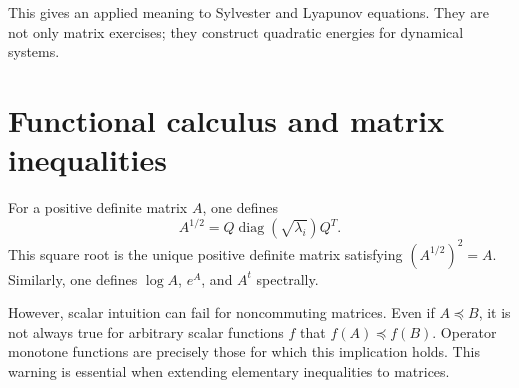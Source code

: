 This gives an applied meaning to Sylvester and Lyapunov equations.  They are not only matrix exercises; they construct quadratic energies for dynamical systems.

\section{Functional calculus and matrix inequalities}

For a positive definite matrix $A$, one defines
\[
  A^{1/2}=Q\operatorname{diag}(\sqrt{\lambda_i})Q^T.
\]
This square root is the unique positive definite matrix satisfying $(A^{1/2})^2=A$.  Similarly, one defines $\log A$, $e^A$, and $A^t$ spectrally.

However, scalar intuition can fail for noncommuting matrices.  Even if $A\preceq B$, it is not always true for arbitrary scalar functions $f$ that $f(A)\preceq f(B)$.  Operator monotone functions are precisely those for which this implication holds.  This warning is essential when extending elementary inequalities to matrices.
